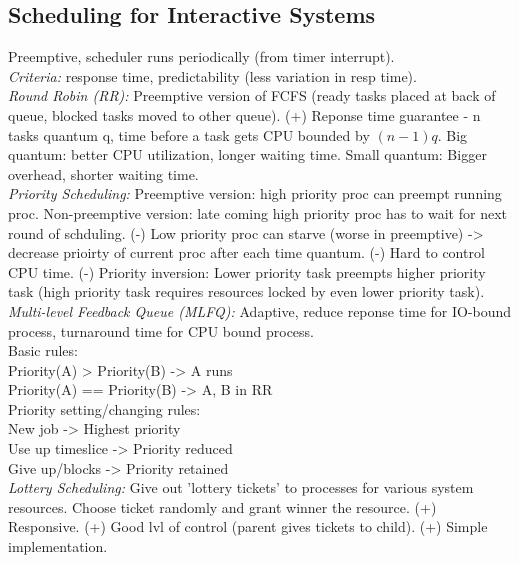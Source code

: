 \subsection*{Scheduling for Interactive Systems}
Preemptive, scheduler runs periodically (from timer interrupt).\\
\emph{Criteria:} response time, predictability (less variation in resp time).\\
\emph{Round Robin (RR):} Preemptive version of FCFS (ready tasks placed at back of queue, blocked tasks moved to other queue). (+) Reponse time guarantee - n tasks quantum q, time before a task gets CPU bounded by $(n-1)q$. Big quantum: better CPU utilization, longer waiting time. Small quantum: Bigger overhead, shorter waiting time.\\
\emph{Priority Scheduling:} Preemptive version: high priority proc can preempt running proc. Non-preemptive version: late coming high priority proc has to wait for next round of schduling. (-) Low priority proc can starve (worse in preemptive) -> decrease prioirty of current proc after each time quantum. (-) Hard to control CPU time. (-) Priority inversion: Lower priority task preempts higher priority task (high priority task requires resources locked by even lower priority task).\\
\emph{Multi-level Feedback Queue (MLFQ):} Adaptive, reduce reponse time for IO-bound process, turnaround time for CPU bound process.\\
Basic rules:\\
Priority(A) > Priority(B) -> A runs\\
Priority(A) == Priority(B) -> A, B in RR\\
Priority setting/changing rules:\\
New job -> Highest priority\\
Use up timeslice -> Priority reduced\\
Give up/blocks -> Priority retained\\
\emph{Lottery Scheduling:} Give out 'lottery tickets' to processes for various system resources. Choose ticket randomly and grant winner the resource. (+) Responsive. (+) Good lvl of control (parent gives tickets to child). (+) Simple implementation.